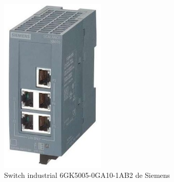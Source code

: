 \begin{figure} [h!]
  \begin{center}
    \includegraphics[width=5cm]{figs/switch_industrial}
  \end{center}
  \caption{\centering Switch industrial 6GK5005-0GA10-1AB2 de Siemens \cite{switch_industrial}}
  \label{fig:switch_industrial}
\end{figure}

